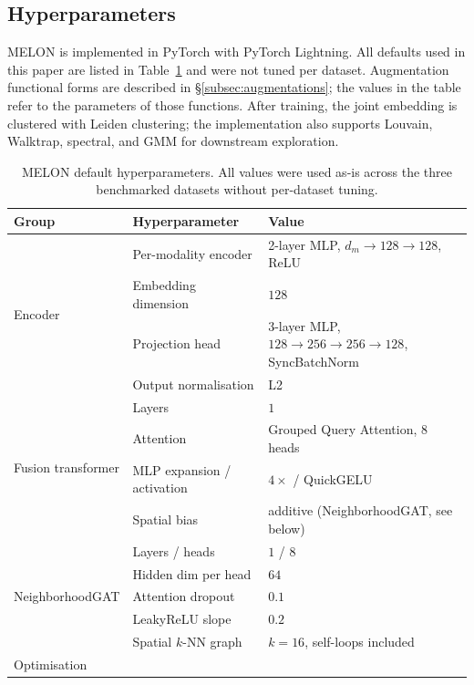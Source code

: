 \documentclass{article}
\theoremstyle{plain}
\theoremstyle{definition}
\begin{document}
\subsection{Hyperparameters}\label{app:impl-hparams}

MELON is implemented in PyTorch with PyTorch Lightning. All defaults used in this paper are listed in Table~\ref{tab:hyperparams} and were not tuned per dataset. Augmentation functional forms are described in \S\ref{subsec:augmentations}; the values in the table refer to the parameters of those functions. After training, the joint embedding is clustered with Leiden clustering; the implementation also supports Louvain, Walktrap, spectral, and GMM for downstream exploration.

\begin{table}[!htbp]
\centering
\caption{MELON default hyperparameters. All values were used as-is across the three benchmarked datasets without per-dataset tuning.}
\label{tab:hyperparams}
\small
\begin{tabular}{lll}
\toprule
Group & Hyperparameter & Value \\
\midrule
\multirow{4}{*}{Encoder}
  & Per-modality encoder      & 2-layer MLP, $d_m \!\rightarrow\! 128 \!\rightarrow\! 128$, ReLU \\
  & Embedding dimension       & $128$ \\
  & Projection head           & 3-layer MLP, $128\!\rightarrow\!256\!\rightarrow\!256\!\rightarrow\!128$, SyncBatchNorm \\
  & Output normalisation      & L2 \\
\midrule
\multirow{4}{*}{Fusion transformer}
  & Layers                    & $1$ \\
  & Attention                 & Grouped Query Attention, $8$ heads \\
  & MLP expansion / activation& $4\times$ / QuickGELU \\
  & Spatial bias              & additive (NeighborhoodGAT, see below) \\
\midrule
\multirow{5}{*}{NeighborhoodGAT}
  & Layers / heads            & $1$ / $8$ \\
  & Hidden dim per head       & $64$ \\
  & Attention dropout         & $0.1$ \\
  & LeakyReLU slope           & $0.2$ \\
  & Spatial $k$-NN graph      & $k=16$, self-loops included \\
\midrule
\multirow{6}{*}{Optimisation}

\end{tabular}
\end{table}
\end{document}
